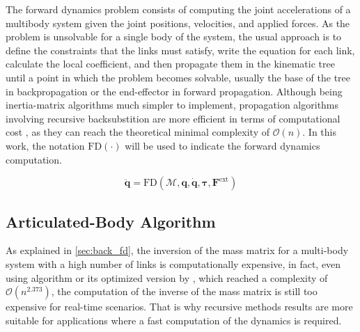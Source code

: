 The forward dynamics problem consists of computing the joint accelerations of a multibody system given the joint positions, velocities, and applied forces. As the problem is unsolvable for a single body of the system, the usual approach is to define the constraints that the links must satisfy, write the equation for each link, calculate the local coefficient, and then propagate them in the kinematic tree until a point in which the problem becomes solvable, usually the base of the tree in backpropagation or the end-effector in forward propagation. Although being inertia-matrix algorithms  much simpler to implement, propagation algorithms involving recursive backsubstition are more efficient in terms of computational cost , as they can reach the theoretical minimal complexity of $\mathcal{O}(n)$. In this work, the notation $\mathrm{FD}(\cdot)$ will be used to indicate the forward dynamics computation.

\begin{equation}
    \ddot{\mathbf{q}} = \mathrm{FD} (\mathcal{M}, \mathbf{q}, \dot{\mathbf{q}}, \boldsymbol{\tau}, \mathbf{F} ^{\text{ext}})
\end{equation}

\subsection{Articulated-Body Algorithm}
\label{subsec:back_aba}

As explained in \cref{sec:back_fd}, the inversion of the mass matrix for a multi-body system with a high number of links is computationally expensive, in fact, even using \citet{coppersmith_matrix_1990} algorithm or its optimized version by \citet{vassilevska-williams2012breaking}, which reached a complexity of $\mathcal{O}(n^{2.373})$, the computation of the inverse of the mass matrix is still too expensive for real-time scenarios. That is why recursive methods results are more suitable for applications where a fast computation of the dynamics is required.

